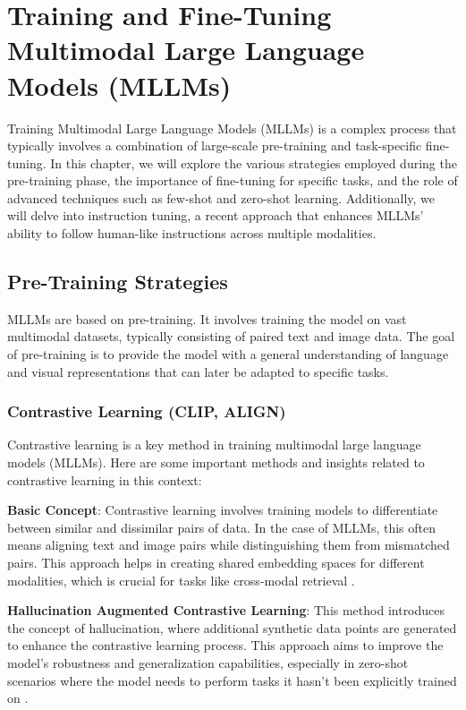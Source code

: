\chapter{Training and Fine-Tuning Multimodal Large Language Models (MLLMs)}



Training Multimodal Large Language Models (MLLMs) is a complex process that typically involves a combination of large-scale pre-training and task-specific fine-tuning. In this chapter, we will explore the various strategies employed during the pre-training phase, the importance of fine-tuning for specific tasks, and the role of advanced techniques such as few-shot and zero-shot learning. Additionally, we will delve into instruction tuning, a recent approach that enhances MLLMs' ability to follow human-like instructions across multiple modalities.

\section{Pre-Training Strategies}

MLLMs are based on pre-training. It involves training the model on vast multimodal datasets, typically consisting of paired text and image data. The goal of pre-training is to provide the model with a general understanding of language and visual representations that can later be adapted to specific tasks.

\subsection{Contrastive Learning (CLIP, ALIGN)}

Contrastive learning is a key method in training multimodal large language models (MLLMs). Here are some important methods and insights related to contrastive learning in this context:

\textbf{Basic Concept}: Contrastive learning involves training models to differentiate between similar and dissimilar pairs of data. In the case of MLLMs, this often means aligning text and image pairs while distinguishing them from mismatched pairs. This approach helps in creating shared embedding spaces for different modalities, which is crucial for tasks like cross-modal retrieval \cite{cite4}.

\textbf{Hallucination Augmented Contrastive Learning}: This method introduces the concept of hallucination, where additional synthetic data points are generated to enhance the contrastive learning process. This approach aims to improve the model's robustness and generalization capabilities, especially in zero-shot scenarios where the model needs to perform tasks it hasn't been explicitly trained on \cite{cite1, cite2}.


